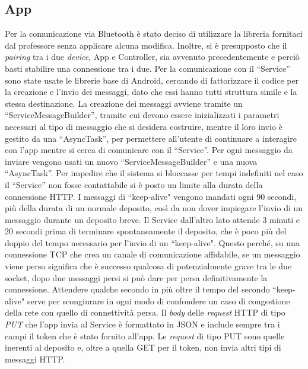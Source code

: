 \documentclass[a4paper, 12pt]{report}
\begin{document}
			\subsection{App}
			Per la comunicazione via Bluetooth è stato deciso di utilizzare la libreria fornitaci dal
			professore senza applicare alcuna modifica. Inoltre, si è presupposto che il \textit{pairing}
			tra i due \textit{device}, App e Controller, sia avvenuto precedentemente e perciò basti
			stabilire una connessione tra i due.\newline
			Per la comunicazione con il ``Service'' sono state usate le librerie base di Android, cercando 
			di fattorizzare il codice per la creazione e l'invio dei messaggi, dato che essi hanno tutti 
			struttura simile e la stessa destinazione. La creazione dei messaggi avviene tramite un ``ServiceMessageBuilder'', 
			tramite cui devono essere inizializzati i parametri necessari al tipo di messaggio che si desidera
			costruire, mentre il loro invio è gestito da una ``AsyncTask'', per permettere all'utente di continuare 
			a interagire con l'app mentre si cerca di comunicare con il ``Service''. Per ogni messaggio da inviare 
			vengono usati un nuovo ``ServiceMessageBuilder'' e una nuova ``AsyncTask''.\newline
			Per impedire che il sistema si bloccasse per tempi indefiniti nel caso il ``Service'' non fosse 
			contattabile si è posto un limite alla durata della connessione HTTP. I messaggi di ``keep-alive" vengono mandati ogni 90 secondi, più della durata di un normale deposito, così
			da non dover impiegare l'invio di un messaggio durante un deposito breve. Il Service
			dall'altro lato attende 3 minuti e 20 secondi prima di terminare spontaneamente il deposito,
			che è poco più del doppio del tempo necessario per l'invio di un ``keep-alive". Questo perché,
			su una connessione TCP che crea un canale di comunicazione affidabile, se un messaggio viene perso
			significa che è successo qualcosa di potenzialmente grave tra le due socket, dopo due messaggi
			persi si può dare per persa definitivamente la connessione. Attendere qualche secondo in più
			oltre il tempo del secondo ``keep-alive" serve per scongiurare in ogni modo di confondere un
			caso di congestione della rete con quello di connettività persa.\newline
			Il \textit{body} delle \textit{request} HTTP di tipo \textit{PUT} che l'app invia al Service è
			formattato in JSON e include sempre tra i campi il token che è stato fornito all'app. Le \textit{request} di tipo PUT sono quelle inerenti al deposito e, oltre a quella GET per il
			token, non invia altri tipi di messaggi HTTP.
\end{document}
